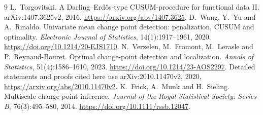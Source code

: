 \documentclass[pdflatex,sn-mathphys-num]{sn-jnl}
\theoremstyle{thmstyleone}
\theoremstyle{thmstyletwo}
\begin{document}
\begin{thebibliography}{9}
L.~Torgovitski.
\newblock A Darling--Erd\H{o}s-type CUSUM-procedure for functional data II.
\newblock arXiv:1407.3625v2, 2016.
\newblock \url{https://arxiv.org/abs/1407.3625}.
D.~Wang, Y.~Yu and A.~Rinaldo.
\newblock Univariate mean change point detection: penalization, CUSUM and optimality.
\newblock \emph{Electronic Journal of Statistics}, 14(1):1917--1961, 2020.
\newblock \url{https://doi.org/10.1214/20-EJS1710}.
N.~Verzelen, M.~Fromont, M.~Lerasle and P.~Reynaud-Bouret.
\newblock Optimal change-point detection and localization.
\newblock \emph{Annals of Statistics}, 51(4):1586--1610, 2023.
\newblock \url{https://doi.org/10.1214/23-AOS2297}.
\newblock Detailed statements and proofs cited here use arXiv:2010.11470v2,
2020, \url{https://arxiv.org/abs/2010.11470v2}.
K.~Frick, A.~Munk and H.~Sieling.
\newblock Multiscale change point inference.
\newblock \emph{Journal of the Royal Statistical Society: Series B},
76(3):495--580, 2014.
\newblock \url{https://doi.org/10.1111/rssb.12047}.
\end{thebibliography}
\end{document}
